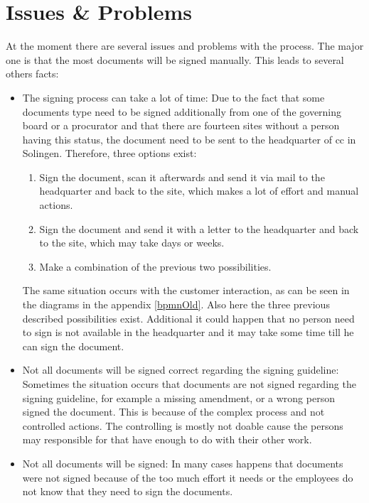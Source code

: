 \section{Issues \& Problems}
At the moment there are several issues and problems with the process. The major one is that the most documents will be signed manually. This leads to several others facts:
\begin{itemize}
	\item The signing process can take a lot of time: \newline
	Due to the fact that some documents type need to be signed additionally from one of the governing board or a procurator and that there are fourteen sites without a person having this status, the document need to be sent to the headquarter of \gls{cc} in Solingen. Therefore, three options exist:
	\begin{enumerate}
		\item Sign the document, scan it afterwards and send it via mail to the headquarter and back to the site, which makes a lot of effort and manual actions.
		\item Sign the document and send it with a letter to the headquarter and back to the site, which may take days or weeks.
		\item Make a combination of the previous two possibilities.
	\end{enumerate}
	The same situation occurs with the customer interaction, as can be seen in the diagrams in the appendix \ref{bpmnOld}. Also here the three previous described possibilities exist. \newline
	Additional it could happen that no person need to sign is not available in the headquarter and it may take some time till he can sign the document.
	\item Not all documents will be signed correct regarding the signing guideline: \newline
	Sometimes the situation occurs that documents are not signed regarding the signing guideline, for example a missing amendment, or a wrong person signed the document. This is because of the complex process and not controlled actions. The controlling is mostly not doable cause the persons may responsible for that have enough to do with their other work.
	\item Not all documents will be signed:\newline
	In many cases happens that documents were not signed because of the too much effort it needs or the employees do not know that they need to sign the documents. 
\end{itemize} 
